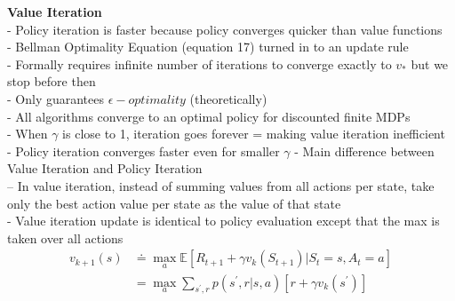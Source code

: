 \documentclass{article}
\begin{document}
\newpage
\noindent
\textbf{Value Iteration}\\
- Policy iteration is faster because policy converges quicker
than value functions\\
- Bellman Optimality Equation (equation 17) turned in to an update rule \\
- Formally requires infinite number of iterations to converge exactly to $v_{*}$
but we stop before then \\
- Only guarantees $\epsilon - optimality$ (theoretically)\\
- All algorithms converge to an optimal policy for discounted finite MDPs\\
- When $\gamma$ is close to 1, iteration goes forever = making value iteration
inefficient\\
- Policy iteration converges faster even for smaller $\gamma$
- Main difference between Value Iteration and Policy Iteration\\
-- In value iteration, instead of summing values from all actions per state,
take only the best action value per state as the value of that state\\
- Value iteration update is identical to policy evaluation except that the max
is taken over all actions\\

\begin{equation}
\begin{aligned}
v_{k+1}(s) & \doteq \max _{a} \mathbb{E}\left[R_{t+1}+\gamma v_{k}\left(S_{t+1}\right) | S_{t}=s, A_{t}=a\right] \\
&=\max _{a} \sum_{s^{\prime}, r} p\left(s^{\prime}, r | s, a\right)\left[r+\gamma v_{k}\left(s^{\prime}\right)\right]
\end{aligned}
\end{equation}
\end{document}
